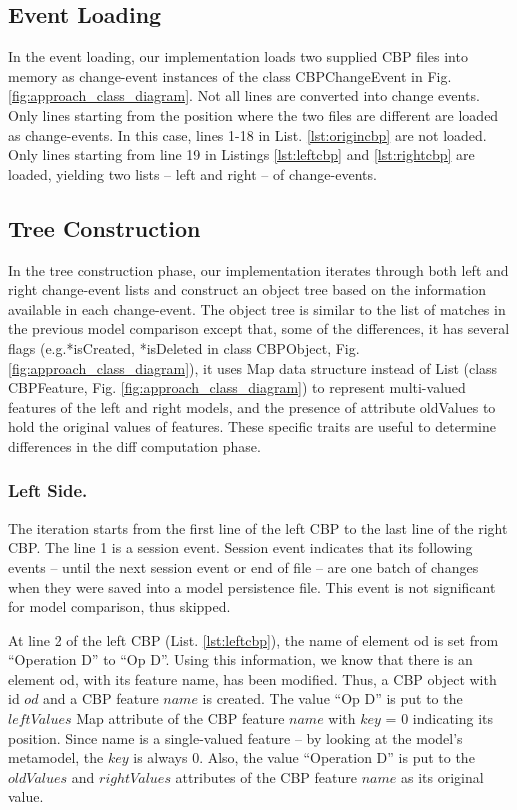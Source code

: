 \documentclass{llncs}
\begin{document}
\subsection{Event Loading}
\label{sec:event_loading}
In the event loading, our implementation loads two supplied CBP files into memory as change-event instances of the class \textsf{CBPChangeEvent} in Fig. \ref{fig:approach_class_diagram}. Not all lines are converted into change events. Only lines starting from the position where the two files are different are loaded as change-events. In this case, lines 1-18 in List. \ref{lst:origincbp} are not loaded. Only lines starting from line 19 in Listings \ref{lst:leftcbp} and \ref{lst:rightcbp} are loaded, yielding two lists -- left and right -- of change-events. 

\subsection{Tree Construction}
\label{sec:tree_construction}
In the tree construction phase, our implementation iterates through both left and right change-event lists and construct an object tree based on the information available in each change-event. The object tree is similar to the list of matches in the previous model comparison except that, some of the differences, it has several flags (e.g.\textsf{*isCreated}, \textsf{*isDeleted} in class \textsf{CBPObject}, Fig. \ref{fig:approach_class_diagram}), it uses Map data structure instead of List (class \textsf{CBPFeature}, Fig. \ref{fig:approach_class_diagram}) to represent multi-valued features of the left and right models, and the presence of attribute \textsf{oldValues} to hold the original values of features. These specific traits are useful to determine differences in the diff computation phase.

\subsubsection{Left Side.}\label{sec:left_side} The iteration starts from the first line of the left CBP to the last line of the right CBP. The line 1 is a session event. Session event indicates that its following events -- until the next session event or end of file -- are one batch of changes when they were saved into a model persistence file. This event is not significant for model comparison, thus skipped.  

At line 2 of the left CBP (List. \ref{lst:leftcbp}), the \textsf{name} of element \textsf{od} is set from ``Operation D'' to ``Op D''. Using this information, we know that there is an element \textsf{od}, with its feature \textsf{name}, has been modified. Thus, a CBP object with id $od$ and a CBP feature $name$ is created. The value ``Op D'' is put to the $leftValues$ Map attribute of the CBP feature $name$ with $key$ = 0 indicating its position. Since \textsf{name} is a single-valued feature -- by looking at the model's metamodel, the $key$ is always 0. Also, the value ``Operation D'' is put to the $oldValues$ and $rightValues$ attributes of the CBP feature $name$ as its original value. 
\end{document}
